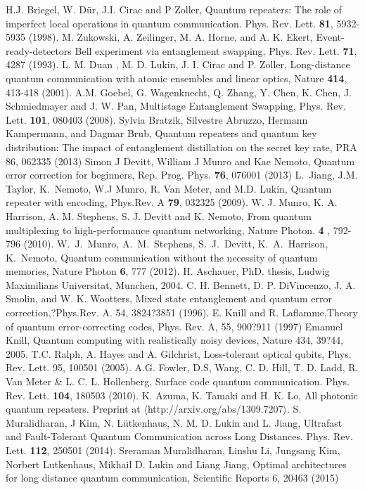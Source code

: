 \documentclass[twocolumn, aps, rmp, amsmath, amssymb, nofootinbib, superscriptaddress, longbibliography, floatfix, table-of-contents, eqsecnum]{revtex4-1}
\begin{document}
\begin{thebibliography}{99}
%
 H.J. Briegel, W. D\"{u}r, J.I. Cirac and P Zoller, Quantum repeaters: The role of imperfect local operations in quantum communication. Phys. Rev. Lett. {\bf 81}, 5932-5935 (1998).
%
 M. Zukowski, A. Zeilinger, M. A. Horne, and A. K. Ekert, Event-ready-detectors Bell experiment via entanglement swapping, Phys. Rev. Lett. {\bf 71}, 4287 (1993).
%
 L. M. Duan , M. D. Lukin, J. I. Cirac and P. Zoller, Long-distance quantum communication with atomic ensembles and linear optics, Nature {\bf 414}, 413-418 (2001).
%
 A.M. Goebel, G. Wagenknecht, Q. Zhang, Y. Chen, K. Chen, J. Schmiedmayer and J. W. Pan, Multistage Entanglement Swapping, Phys. Rev. Lett. {\bf 101}, 080403 (2008).
%
 Sylvia Bratzik, Silvestre Abruzzo, Hermann Kampermann, and Dagmar Brub, Quantum repeaters and quantum key distribution: The impact of entanglement
distillation on the secret key rate, PRA 86, 062335 (2013)
%
 Simon J Devitt, William J Munro and Kae Nemoto, Quantum error correction for beginners, Rep. Prog. Phys. {\bf 76}, 076001 (2013)
%
 L.~Jiang, J.M. Taylor, K.~Nemoto, W.J Munro, R. Van Meter, and M.D. Lukin, Quantum repeater with encoding, Phys.Rev. A {\bf 79}, 032325 (2009).
%
 W. J. Munro, K. A. Harrison, A. M. Stephens, S. J. Devitt and K. Nemoto, From quantum multiplexing to high-performance quantum networking, Nature Photon. {\bf 4} , 792-796 (2010). 
%
  W.~J.~Munro, A.~M.~Stephens, S.~J.~Devitt, K.~A.~Harrison, K.~Nemoto, Quantum communication without the necessity
 of quantum memories, Nature Photon {\bf 6}, 777 (2012).
 H. Aschauer, PhD. thesis, Ludwig Maximilians Universitat, Munchen, 2004.
%
 C. H. Bennett, D. P. DiVincenzo, J. A. Smolin, and W. K. Wootters,
Mixed state entanglement and quantum error correction,?Phys.Rev. A. 54, 3824?3851 (1996).
%
E. Knill and R. Laflamme,Theory of quantum error-correcting codes, Phys. Rev. A, 55, 900?911 (1997)
%
 Emanuel Knill, Quantum computing with realistically noisy devices, Nature 434, 39?44, 2005.
%
 T.C. Ralph, A. Hayes and A. Gilchrist, Loss-tolerant optical qubits, Phys. Rev. Lett. 95, 100501 (2005).
%
 A.G. Fowler, D.S, Wang, C. D. Hill, T. D. Ladd, R. Van Meter \& L. C. L. Hollenberg, Surface code quantum communication. Phys. Rev. Lett. {\bf  104}, 180503 (2010).
%
 K. Azuma, K. Tamaki and H. K. Lo, All photonic quantum repeaters. Preprint at $\langle$http://arxiv.org/abs/1309.7207$\rangle$.
%
 S. Muralidharan, J Kim, N. L\"utkenhaus, N. M. D. Lukin and L. Jiang, Ultrafast and Fault-Tolerant Quantum Communication across Long Distances. Phys. Rev. Lett. {\bf 112}, 250501 (2014).
%
 Sreraman Muralidharan, Linshu Li,  Jungsang Kim, Norbert Lutkenhaus, Mikhail D. Lukin and Liang Jiang, Optimal architectures for long distance quantum communication, Scientific Reports 6, 20463 (2015)


\end{thebibliography}
\end{document}
